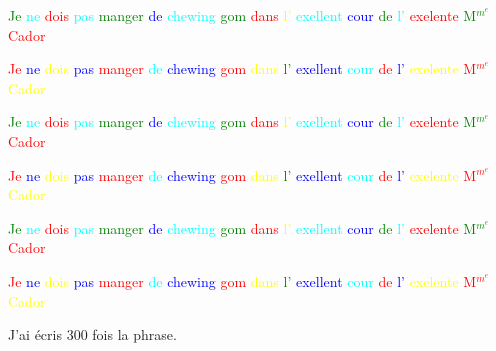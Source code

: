 \documentclass[12pt,a4paper]{article}
\begin{document}
\textcolor{green}{Je} \textcolor{cyan}{ne} \textcolor{red}{dois} \textcolor{cyan}{pas} \textcolor{green}{manger} \textcolor{blue}{de} \textcolor{cyan}{chewing} \textcolor{green}{gom} \textcolor{red}{dans} \textcolor{yellow}{l'} \textcolor{cyan}{exellent} \textcolor{blue}{cour} \textcolor{green}{de} \textcolor{cyan}{l'} \textcolor{red}{exelente} \textcolor{green}{M$^m^e$} \textcolor{red}{Cador}

\textcolor{red}{Je} \textcolor{blue}{ne} \textcolor{yellow}{dois} \textcolor{blue}{pas} \textcolor{red}{manger} \textcolor{cyan}{de} \textcolor{blue}{chewing} \textcolor{red}{gom} \textcolor{yellow}{dans} \textcolor{green}{l'} \textcolor{blue}{exellent} \textcolor{cyan}{cour} \textcolor{red}{de} \textcolor{blue}{l'} \textcolor{yellow}{exelente} \textcolor{red}{M$^m^e$} \textcolor{yellow}{Cador}

\textcolor{green}{Je} \textcolor{cyan}{ne} \textcolor{red}{dois} \textcolor{cyan}{pas} \textcolor{green}{manger} \textcolor{blue}{de} \textcolor{cyan}{chewing} \textcolor{green}{gom} \textcolor{red}{dans} \textcolor{yellow}{l'} \textcolor{cyan}{exellent} \textcolor{blue}{cour} \textcolor{green}{de} \textcolor{cyan}{l'} \textcolor{red}{exelente} \textcolor{green}{M$^m^e$} \textcolor{red}{Cador}

\textcolor{red}{Je} \textcolor{blue}{ne} \textcolor{yellow}{dois} \textcolor{blue}{pas} \textcolor{red}{manger} \textcolor{cyan}{de} \textcolor{blue}{chewing} \textcolor{red}{gom} \textcolor{yellow}{dans} \textcolor{green}{l'} \textcolor{blue}{exellent} \textcolor{cyan}{cour} \textcolor{red}{de} \textcolor{blue}{l'} \textcolor{yellow}{exelente} \textcolor{red}{M$^m^e$} \textcolor{yellow}{Cador}

\textcolor{green}{Je} \textcolor{cyan}{ne} \textcolor{red}{dois} \textcolor{cyan}{pas} \textcolor{green}{manger} \textcolor{blue}{de} \textcolor{cyan}{chewing} \textcolor{green}{gom} \textcolor{red}{dans} \textcolor{yellow}{l'} \textcolor{cyan}{exellent} \textcolor{blue}{cour} \textcolor{green}{de} \textcolor{cyan}{l'} \textcolor{red}{exelente} \textcolor{green}{M$^m^e$} \textcolor{red}{Cador}

\textcolor{red}{Je} \textcolor{blue}{ne} \textcolor{yellow}{dois} \textcolor{blue}{pas} \textcolor{red}{manger} \textcolor{cyan}{de} \textcolor{blue}{chewing} \textcolor{red}{gom} \textcolor{yellow}{dans} \textcolor{green}{l'} \textcolor{blue}{exellent} \textcolor{cyan}{cour} \textcolor{red}{de} \textcolor{blue}{l'} \textcolor{yellow}{exelente} \textcolor{red}{M$^m^e$} \textcolor{yellow}{Cador}

J'ai écris 300 fois la phrase.
\end{document}
